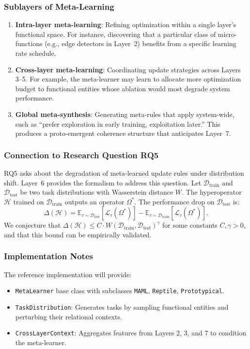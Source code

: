 \subsubsection{Sublayers of Meta-Learning}
\begin{enumerate}
    \item \textbf{Intra-layer meta-learning}: Refining optimization within a single layer's functional space. For instance, discovering that a particular class of micro-functions (e.g., edge detectors in Layer~2) benefits from a specific learning rate schedule.
    \item \textbf{Cross-layer meta-learning}: Coordinating update strategies across Layers 3--5. For example, the meta-learner may learn to allocate more optimization budget to functional entities whose ablation would most degrade system performance.
    \item \textbf{Global meta-synthesis}: Generating meta-rules that apply system-wide, such as ``prefer exploration in early training, exploitation later.'' This produces a proto-emergent coherence structure that anticipates Layer~7.
\end{enumerate}

\subsubsection{Connection to Research Question RQ5}
RQ5 asks about the degradation of meta-learned update rules under distribution shift. Layer~6 provides the formalism to address this question. Let $\mathcal{D}_{\text{train}}$ and $\mathcal{D}_{\text{test}}$ be two task distributions with Wasserstein distance $W$. The hyperoperator $\mathcal{H}$ trained on $\mathcal{D}_{\text{train}}$ outputs an operator $\Omega^*$. The performance drop on $\mathcal{D}_{\text{test}}$ is:
\[
\Delta(\mathcal{H}) = \mathbb{E}_{\tau \sim \mathcal{D}_{\text{test}}}[\mathcal{L}_\tau(\Omega^*)] - \mathbb{E}_{\tau \sim \mathcal{D}_{\text{train}}}[\mathcal{L}_\tau(\Omega^*)].
\]
We conjecture that $\Delta(\mathcal{H}) \le C \cdot W(\mathcal{D}_{\text{train}}, \mathcal{D}_{\text{test}})^\gamma$ for some constants $C, \gamma > 0$, and that this bound can be empirically validated.

\subsubsection{Implementation Notes}
The reference implementation will provide:
\begin{itemize}
    \item \texttt{MetaLearner} base class with subclasses \texttt{MAML}, \texttt{Reptile}, \texttt{Prototypical}.
    \item \texttt{TaskDistribution}: Generates tasks by sampling functional entities and perturbing their relational contexts.
    \item \texttt{CrossLayerContext}: Aggregates features from Layers 2, 3, and 7 to condition the meta-learner.
\end{itemize}

